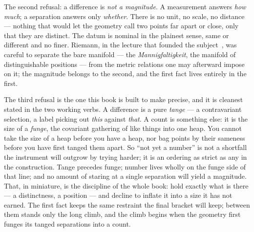 The second refusal: a difference is \emph{not a magnitude}. A measurement answers \emph{how much}; a separation answers only
\emph{whether}. There is no unit, no scale, no distance --- nothing that would let the geometry call two points far apart or
close, only that they are distinct. The datum is nominal in the plainest sense, same or different and no finer. Riemann, in
the lecture that founded the subject~\cite{riemann1854}, was careful to separate the bare manifold --- the
\emph{Mannigfaltigkeit}, the manifold of distinguishable positions --- from the metric relations one may afterward impose on
it; the magnitude belongs to the second, and the first fact lives entirely in the first.

The third refusal is the one this book is built to make precise, and it is cleanest stated in the two working verbs. A
difference is a pure \emph{tange} --- a contravariant selection, a label picking out \emph{this} against \emph{that}. A count
is something else: it is the size of a \emph{funge}, the covariant gathering of like things into one heap. You cannot take
the size of a heap before you have a heap, nor bag points by their sameness before you have first tanged them apart. So ``not
yet a number'' is not a shortfall the instrument will outgrow by trying harder; it is an ordering as strict as any in the
construction. Tange precedes funge; number lives wholly on the funge side of that line; and no amount of staring at a single
separation will yield a magnitude. That, in miniature, is the discipline of the whole book: hold exactly what is there --- a
distinctness, a position --- and decline to inflate it into a size it has not earned. The first fact keeps the same restraint
the final bracket will keep; between them stands only the long climb, and the climb begins when the geometry first funges its
tanged separations into a count.
